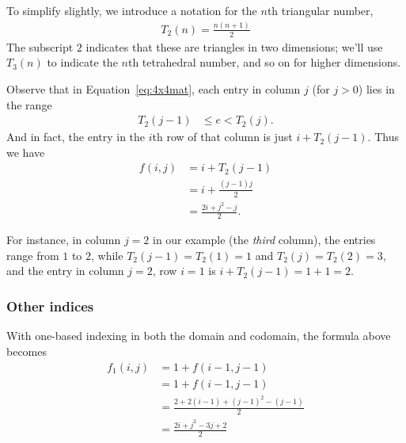 \documentclass{article} %
\begin{document}
To simplify slightly, we introduce a notation for the $n$th triangular number, 
\begin{align}
T_2(n) = \frac{n(n+1)}{2}
\end{align}
\noindent
The subscript $2$ indicates that these are triangles in two dimensions; we'll use $T_3(n)$ to indicate the $n$th tetrahedral number, and so on for higher dimensions. 

Observe that in Equation~\ref{eq:4x4mat}, each entry in column $j$ (for $j > 0$) lies in the range
\begin{align}
T_2(j-1) &\le e < T_2(j).
\end{align}
\noindent
And in fact, the entry in the $i$th row of that column is just $i + T_2(j-1)$. Thus we have
\begin{align}
f(i, j) 
&= i + T_2(j-1)\\
&= i + \frac{(j-1)j}{2}\\
&=  \frac{2i + j^2-j}{2}.
\end{align}

For instance, in column $j = 2$ in our example (the \emph{third} column), the entries range from $1$ to $2$, while $T_2(j-1) = T_2(1) = 1$ and $T_2(j) = T_2(2) = 3$, and the entry in column $j = 2$, row $i = 1$ is 
$i + T_2(j-1) = 1 + 1 = 2$. 

\subsubsection{Other indices}
With one-based indexing in both the domain and codomain, the formula above becomes
\begin{align}
f_1(i, j) &= 1+ f(i-1, j-1) \\
&= 1+ f(i-1, j-1) \\
& = \frac{2 + 2(i-1) + (j-1)^2-(j-1)}{2}\\
& = \frac{2i + j^2 - 3j + 2}{2}
\end{align}
\end{document}
